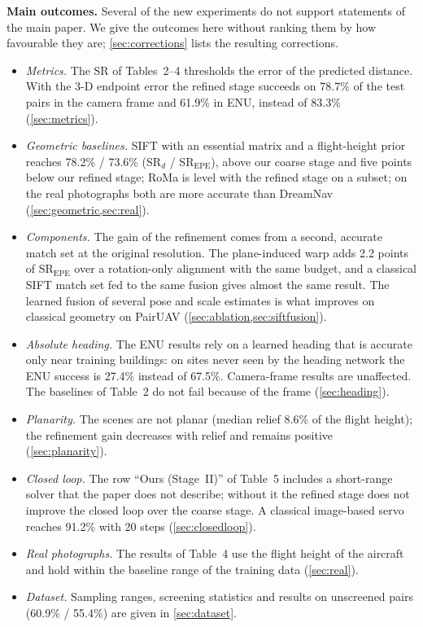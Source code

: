 \documentclass[10pt,twocolumn,letterpaper]{article}
\newcommand{\SRd}{SR$_{d}$}
\newcommand{\SRe}{SR$_{\mathrm{EPE}}$}
\begin{document}
\noindent\textbf{Main outcomes.} Several of the new experiments do not support statements of the main paper. We give the outcomes here without ranking them by how favourable they are; \cref{sec:corrections} lists the resulting corrections.
\begin{itemize}[leftmargin=*,itemsep=1pt,topsep=3pt]
\item \emph{Metrics.} The SR of Tables~2--4 thresholds the error of the predicted distance. With the 3-D endpoint error the refined stage succeeds on 78.7\% of the test pairs in the camera frame and 61.9\% in ENU, instead of 83.3\% (\cref{sec:metrics}).
\item \emph{Geometric baselines.} SIFT with an essential matrix and a flight-height prior reaches 78.2\% / 73.6\% (\SRd{} / \SRe), above our coarse stage and five points below our refined stage; RoMa is level with the refined stage on a subset; on the real photographs both are more accurate than DreamNav (\cref{sec:geometric,sec:real}).
\item \emph{Components.} The gain of the refinement comes from a second, accurate match set at the original resolution. The plane-induced warp adds 2.2 points of \SRe{} over a rotation-only alignment with the same budget, and a classical SIFT match set fed to the same fusion gives almost the same result. The learned fusion of several pose and scale estimates is what improves on classical geometry on PairUAV (\cref{sec:ablation,sec:siftfusion}).
\item \emph{Absolute heading.} The ENU results rely on a learned heading that is accurate only near training buildings: on sites never seen by the heading network the ENU success is 27.4\% instead of 67.5\%. Camera-frame results are unaffected. The baselines of Table~2 do not fail because of the frame (\cref{sec:heading}).
\item \emph{Planarity.} The scenes are not planar (median relief 8.6\% of the flight height); the refinement gain decreases with relief and remains positive (\cref{sec:planarity}).
\item \emph{Closed loop.} The row ``Ours (Stage~II)'' of Table~5 includes a short-range solver that the paper does not describe; without it the refined stage does not improve the closed loop over the coarse stage. A classical image-based servo reaches 91.2\% with 20 steps (\cref{sec:closedloop}).
\item \emph{Real photographs.} The results of Table~4 use the flight height of the aircraft and hold within the baseline range of the training data (\cref{sec:real}).
\item \emph{Dataset.} Sampling ranges, screening statistics and results on unscreened pairs (60.9\% / 55.4\%) are given in \cref{sec:dataset}.
\end{itemize}
\end{document}
